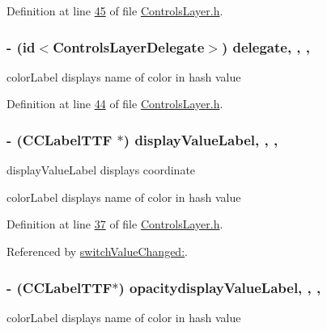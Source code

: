 Definition at line \hyperlink{_controls_layer_8h_source_l00045}{45} of file \hyperlink{_controls_layer_8h_source}{Controls\-Layer.\-h}.

\hypertarget{interface_controls_layer_aebfe5471226d1bc0afef5d662219f913}{
\subsubsection[{delegate}]{\setlength{\rightskip}{0pt plus 5cm}-\/ (id$<${\bf Controls\-Layer\-Delegate}$>$) delegate\hspace{0.3cm}{\ttfamily [read]}, {\ttfamily [write]}, {\ttfamily [nonatomic]}, {\ttfamily [weak]}}}\label{d1/d1a/interface_controls_layer_aebfe5471226d1bc0afef5d662219f913}
color\-Label displays name of color in hash value 

Definition at line \hyperlink{_controls_layer_8h_source_l00044}{44} of file \hyperlink{_controls_layer_8h_source}{Controls\-Layer.\-h}.

\hypertarget{interface_controls_layer_ab9f12f7a90a0bf6ae1abaeb4d4c4e378}{
\subsubsection[{display\-Value\-Label}]{\setlength{\rightskip}{0pt plus 5cm}-\/ (C\-C\-Label\-T\-T\-F $\ast$) display\-Value\-Label\hspace{0.3cm}{\ttfamily [read]}, {\ttfamily [write]}, {\ttfamily [nonatomic]}, {\ttfamily [strong]}}}\label{d1/d1a/interface_controls_layer_ab9f12f7a90a0bf6ae1abaeb4d4c4e378}
display\-Value\-Label displays coordinate

color\-Label displays name of color in hash value 

Definition at line \hyperlink{_controls_layer_8h_source_l00037}{37} of file \hyperlink{_controls_layer_8h_source}{Controls\-Layer.\-h}.



Referenced by \hyperlink{_controls_layer_8mm_source_l00503}{switch\-Value\-Changed\-:}.

\hypertarget{interface_controls_layer_a1a60fd6edd83a2789b575845390a44be}{
\subsubsection[{opacitydisplay\-Value\-Label}]{\setlength{\rightskip}{0pt plus 5cm}-\/ (C\-C\-Label\-T\-T\-F$\ast$) opacitydisplay\-Value\-Label\hspace{0.3cm}{\ttfamily [read]}, {\ttfamily [write]}, {\ttfamily [nonatomic]}, {\ttfamily [strong]}}}\label{d1/d1a/interface_controls_layer_a1a60fd6edd83a2789b575845390a44be}
color\-Label displays name of color in hash value 


